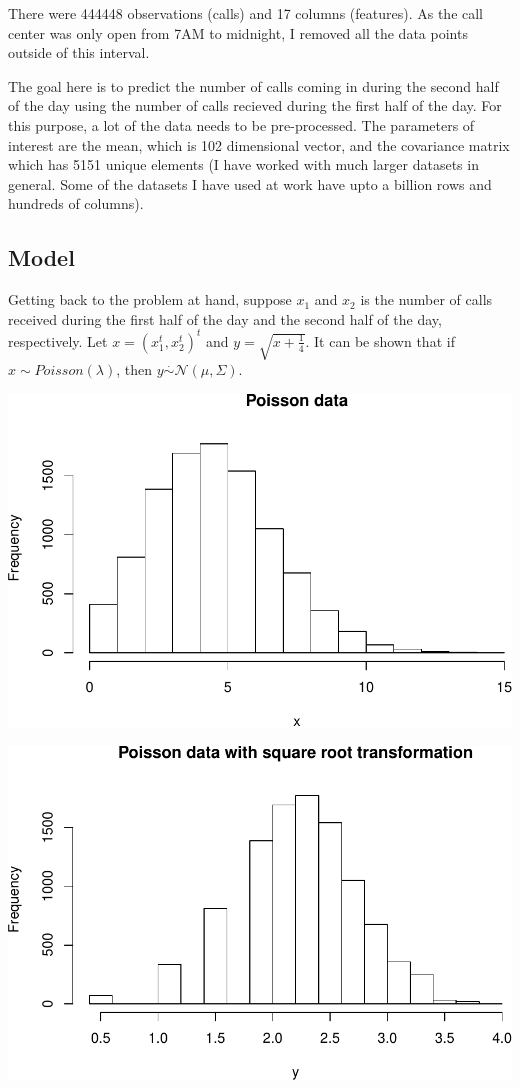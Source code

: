 \documentclass[]{article}
\begin{document}
There were 444448 observations (calls) and 17 columns (features). As the
call center was only open from 7AM to midnight, I removed all the data
points outside of this interval.

The goal here is to predict the number of calls coming in during the
second half of the day using the number of calls recieved during the
first half of the day. For this purpose, a lot of the data needs to be
pre-processed. The parameters of interest are the mean, which is 102
dimensional vector, and the covariance matrix which has 5151 unique
elements (I have worked with much larger datasets in general. Some of
the datasets I have used at work have upto a billion rows and hundreds
of columns).

\subsection{Model}\label{model}

Getting back to the problem at hand, suppose \(x_1\) and \(x_2\) is the
number of calls received during the first half of the day and the second
half of the day, respectively. Let \(x = (x_1^t, x_2^t)^t\) and
\(y = \sqrt{x + \frac{1}{4}}\). It can be shown that if
\(x \sim Poisson(\lambda)\), then
\(y \overset{.}{\sim} \mathcal{N}(\mu,\Sigma)\).

\includegraphics{call_center_data_files/figure-latex/poisson-1.pdf}

\includegraphics{call_center_data_files/figure-latex/normal-1.pdf}
\end{document}
